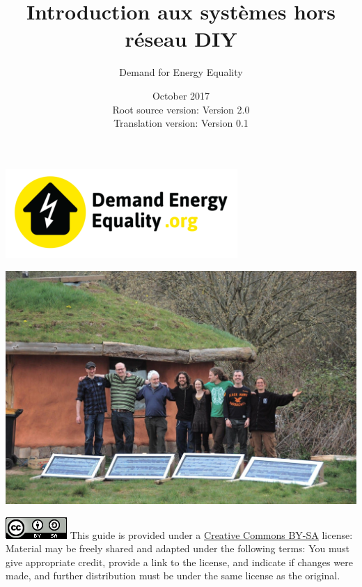 \documentclass{article}
\title{Introduction aux systèmes hors réseau DIY}
\author{Demand for Energy Equality}
\date{October 2017 \\ Root source version: Version 2.0 \\ Translation version: Version 0.1}
\theoremstyle{definition}
\theoremstyle{definition}
\theoremstyle{remark}
\begin{document}
 
\maketitle{}

\begin{center}
  \includegraphics[width=0.25\paperwidth]{../Images/image_0_0_(demand_energy_equality).png}
\end{center}

\begin{center}
  \includegraphics[width=0.65\paperwidth]{../Images/image_0_1_(off_grid).png}
\end{center}

\vfill
  
\includegraphics[]{../Images/image_0_2_(license).png} \newline
This guide is provided under a \href{https://creativecommons.org/licenses/by-sa/4.0/legalcode}{\underline{Creative Commons BY-SA}} license: \newline
Material may be freely shared and adapted under the following terms: You must give appropriate credit, provide a link to the license, and indicate if changes were made, and further distribution must be under the same license as the original.
\end{document}
